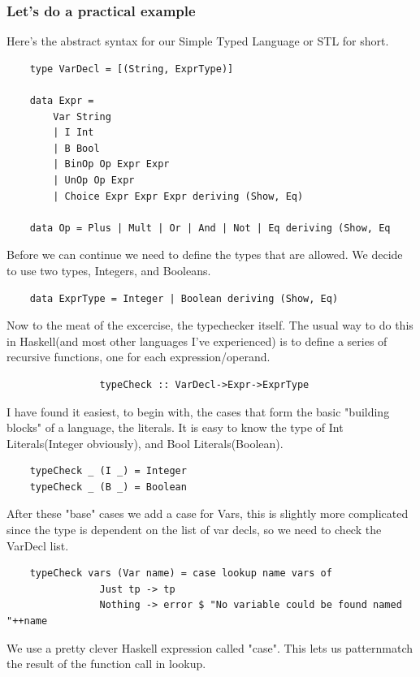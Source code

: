 \documentclass{article}
\begin{document}
            \subsubsection*{Let's do a practical example}
            Here's the abstract syntax for our Simple Typed Language or STL for short.
            \begin{lstlisting}
    type VarDecl = [(String, ExprType)]

    data Expr =
        Var String
        | I Int
        | B Bool
        | BinOp Op Expr Expr
        | UnOp Op Expr
        | Choice Expr Expr Expr deriving (Show, Eq)
                
    data Op = Plus | Mult | Or | And | Not | Eq deriving (Show, Eq
            \end{lstlisting}
            Before we can continue we need to define the types that are allowed. We decide to use two types, Integers, and Booleans.
            \begin{lstlisting}
    data ExprType = Integer | Boolean deriving (Show, Eq)
            \end{lstlisting}
            Now to the meat of the excercise, the typechecker itself.
            The usual way to do this in Haskell(and most other languages I've experienced) is to define a series of recursive functions, one for each
            expression/operand.
            \begin{lstlisting}
                typeCheck :: VarDecl->Expr->ExprType
            \end{lstlisting}
            I have found it easiest, to begin with, the cases that form the basic "building blocks" of a language, the literals. It is easy to know the type of Int Literals(Integer obviously), and Bool Literals(Boolean).
            \begin{lstlisting}
    typeCheck _ (I _) = Integer
    typeCheck _ (B _) = Boolean
            \end{lstlisting} 
            After these "base" cases we add a case for Vars, this is slightly more complicated since the type is dependent on the list of var decls, 
            so we need to check the VarDecl list.
            \begin{lstlisting}
    typeCheck vars (Var name) = case lookup name vars of
                Just tp -> tp
                Nothing -> error $ "No variable could be found named "++name
            \end{lstlisting}
            We use a pretty clever Haskell expression called "case". This lets us patternmatch the result of the function call in lookup. 
\end{document}
